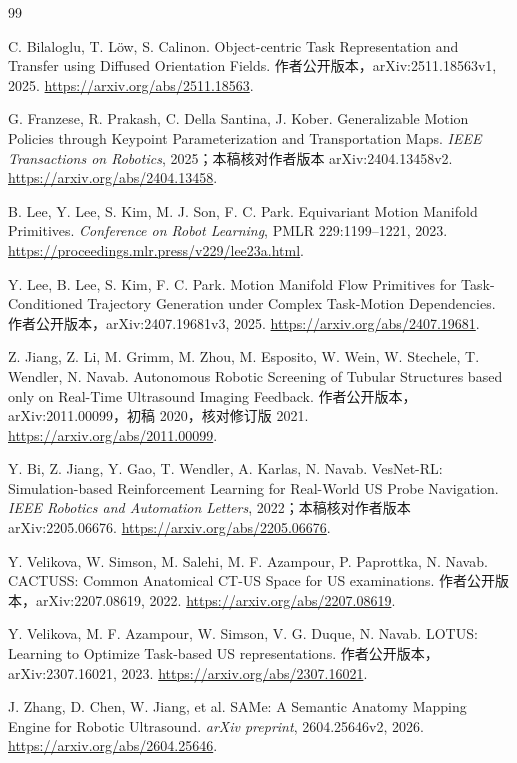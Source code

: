 \documentclass[UTF8,11pt,a4paper,fontset=fandol]{ctexart}
\numberwithin{equation}{section}
\theoremstyle{definition}
\begin{document}
\clearpage
\begin{thebibliography}{99}
\raggedright
{}
C. Bilaloglu, T. L\"ow, S. Calinon.
Object-centric Task Representation and Transfer using Diffused Orientation Fields.
作者公开版本，arXiv:2511.18563v1, 2025.
\url{https://arxiv.org/abs/2511.18563}.

G. Franzese, R. Prakash, C. Della Santina, J. Kober.
Generalizable Motion Policies through Keypoint Parameterization and Transportation Maps.
\emph{IEEE Transactions on Robotics}, 2025；本稿核对作者版本 arXiv:2404.13458v2.
\url{https://arxiv.org/abs/2404.13458}.

B. Lee, Y. Lee, S. Kim, M. J. Son, F. C. Park.
Equivariant Motion Manifold Primitives.
\emph{Conference on Robot Learning}, PMLR 229:1199--1221, 2023.
\url{https://proceedings.mlr.press/v229/lee23a.html}.

Y. Lee, B. Lee, S. Kim, F. C. Park.
Motion Manifold Flow Primitives for Task-Conditioned Trajectory Generation under Complex Task-Motion Dependencies.
作者公开版本，arXiv:2407.19681v3, 2025.
\url{https://arxiv.org/abs/2407.19681}.

Z. Jiang, Z. Li, M. Grimm, M. Zhou, M. Esposito, W. Wein, W. Stechele, T. Wendler, N. Navab.
Autonomous Robotic Screening of Tubular Structures based only on Real-Time Ultrasound Imaging Feedback.
作者公开版本，arXiv:2011.00099，初稿 2020，核对修订版 2021.
\url{https://arxiv.org/abs/2011.00099}.

Y. Bi, Z. Jiang, Y. Gao, T. Wendler, A. Karlas, N. Navab.
VesNet-RL: Simulation-based Reinforcement Learning for Real-World US Probe Navigation.
\emph{IEEE Robotics and Automation Letters}, 2022；本稿核对作者版本 arXiv:2205.06676.
\url{https://arxiv.org/abs/2205.06676}.

Y. Velikova, W. Simson, M. Salehi, M. F. Azampour, P. Paprottka, N. Navab.
CACTUSS: Common Anatomical CT-US Space for US examinations.
作者公开版本，arXiv:2207.08619, 2022.
\url{https://arxiv.org/abs/2207.08619}.

Y. Velikova, M. F. Azampour, W. Simson, V. G. Duque, N. Navab.
LOTUS: Learning to Optimize Task-based US representations.
作者公开版本，arXiv:2307.16021, 2023.
\url{https://arxiv.org/abs/2307.16021}.

J. Zhang, D. Chen, W. Jiang, et al.
SAMe: A Semantic Anatomy Mapping Engine for Robotic Ultrasound.
\emph{arXiv preprint}, 2604.25646v2, 2026.
\url{https://arxiv.org/abs/2604.25646}.


\end{thebibliography}
\end{document}
